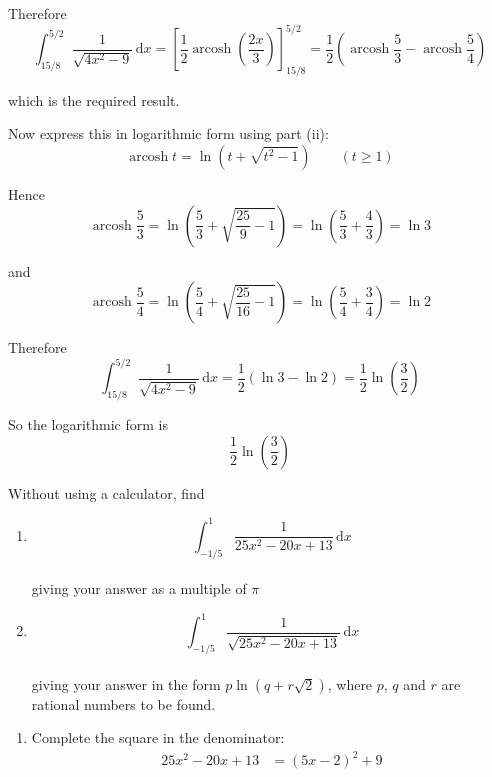 \documentclass[leqno]{article}
\begin{document}
\begin{enumerate}[
  label=\textbf{\arabic*.},
  leftmargin=*,
  topsep=0pt,
  partopsep=0pt,
  parsep=0pt
]
\begin{djsSolution}
\begin{enumerate}[label=\textbf{(\roman*)}]
Therefore
\[
\int_{15/8}^{5/2}\frac{1}{\sqrt{4x^2-9}}\,\mathrm{d}x
=\left[\frac12\operatorname{arcosh}\left(\frac{2x}{3}\right)\right]_{15/8}^{5/2}
=\frac12\left(\operatorname{arcosh}\frac53-\operatorname{arcosh}\frac54\right)
\]

which is the required result.

Now express this in logarithmic form using part (ii):
\[
\operatorname{arcosh} t=\ln\left(t+\sqrt{t^2-1}\right)\qquad (t\ge 1)
\]

Hence
\[
\operatorname{arcosh}\frac53
=\ln\left(\frac53+\sqrt{\frac{25}{9}-1}\right)
=\ln\left(\frac53+\frac43\right)
=\ln 3
\]

and
\[
\operatorname{arcosh}\frac54
=\ln\left(\frac54+\sqrt{\frac{25}{16}-1}\right)
=\ln\left(\frac54+\frac34\right)
=\ln 2
\]

Therefore
\[
\int_{15/8}^{5/2}\frac{1}{\sqrt{4x^2-9}}\,\mathrm{d}x
=\frac12(\ln 3-\ln 2)
=\frac12\ln\left(\frac32\right)
\]

So the logarithmic form is
\[
\frac12\ln\left(\frac32\right)
\]
\end{enumerate}
\end{djsSolution}


\newpage

\questionitem

Without using a calculator, find \\
\begin{enumerate}[label=\textbf{(\alph*)}]
  \item
  \[
  \int_{-1/5}^{1} \frac{1}{25x^2-20x+13}\,\mathrm{d}x
  \] \\
  giving your answer as a multiple of $\pi$  \\
  \item
  \[
  \int_{-1/5}^{1} \frac{1}{\sqrt{25x^2-20x+13}}\,\mathrm{d}x
  \] \\
  giving your answer in the form $p\ln(q+r\sqrt{2})$, where $p$, $q$ and $r$ are rational numbers to be found.  \\
\end{enumerate}

\vspace*{10pt}

\begin{djsSolution}
\begin{enumerate}[label=\textbf{(\alph*)}]
  \item Complete the square in the denominator:
  \begin{align*}
  25x^2-20x+13
  &= (5x-2)^2+9
  \end{align*}


\end{enumerate}
\end{djsSolution}
\end{enumerate}
\end{document}
